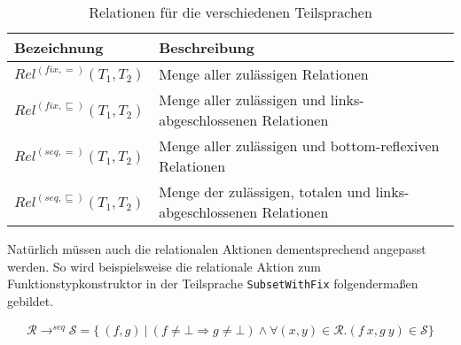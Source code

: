 \begin{table}[th]
\centering
\begin{tabular}{| l | l |}
\hline
Bezeichnung & Beschreibung \\
\hline
$Rel^{(fix, =)}(T_1, T_2)$ & Menge aller zulässigen Relationen \\
$Rel^{(fix, \sqsubseteq)}(T_1, T_2)$ & Menge aller zulässigen und links-abgeschlossenen Relationen \\
$Rel^{(seq, =)}(T_1, T_2)$ & Menge aller zulässigen und bottom-reflexiven Relationen \\
$Rel^{(seq, \sqsubseteq)}(T_1, T_2)$ & Menge der zulässigen, totalen und links-abgeschlossenen Relationen \\
\hline
\end{tabular}
\caption{Relationen für die verschiedenen Teilsprachen}
\label{tab:relations}
\end{table}



Natürlich müssen auch die relationalen Aktionen dementsprechend angepasst werden. So wird beispielsweise die relationale
Aktion zum Funktionstypkonstruktor in der Teilsprache \texttt{SubsetWithFix} folgendermaßen gebildet.

\begin{align*}
\mathcal{R} \rightarrow^{seq} \mathcal{S} = \{~(f, g)~|~(f \neq \bot \Rightarrow g \neq \bot) \wedge
\forall (x, y) \in \mathcal{R}. (f\ x, g\ y) \in \mathcal{S} \}
\end{align*}